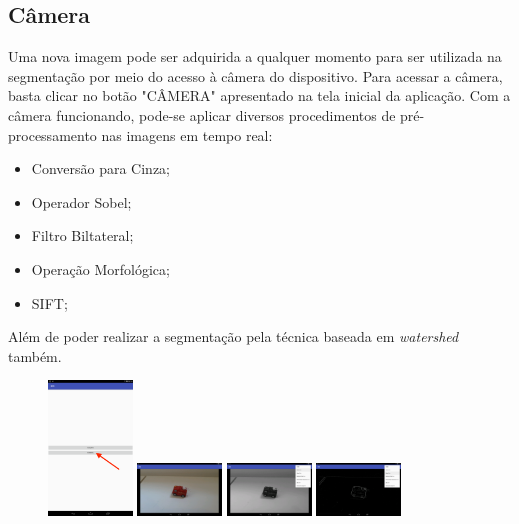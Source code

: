 \subsection{Câmera}

Uma nova imagem pode ser adquirida a qualquer momento para ser utilizada na segmentação por meio do acesso à câmera do dispositivo. Para acessar a câmera, basta clicar no botão "CÂMERA" apresentado na tela inicial da aplicação.
Com a câmera funcionando, pode-se aplicar diversos procedimentos de pré-processamento nas imagens em tempo real:

\begin{itemize}
    \item Conversão para Cinza;
    \item Operador Sobel;
    \item Filtro Biltateral;
    \item Operação Morfológica;
    \item SIFT;
\end{itemize}

Além de poder realizar a segmentação pela técnica baseada em \textit{watershed} também.

\begin{figure}[!htb]
 \centering
 \def\baselinestretch{1}\small\normalsize
 \includegraphics[width=0.2\textwidth]{img/camera_app_n1.png}\qquad
 \includegraphics[width=0.2\textwidth]{img/camera_app_n2.png}  \qquad 
 \includegraphics[width=0.2\textwidth]{img/camera_app_n3.png}  \qquad
 \includegraphics[width=0.2\textwidth]{img/camera_app_n4.png}        
\end{figure}
 
